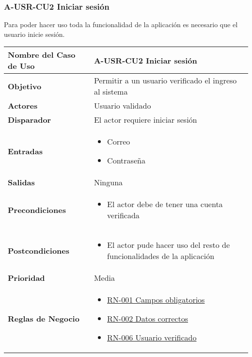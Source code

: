 \subsubsection{A-USR-CU2 Iniciar sesión}
Para poder hacer uso toda la funcionalidad de la aplicación es necesario que el usuario inicie sesión.
\begin{longtable}{|J{5cm}|J{10.3cm}|}
	\hline
	\textbf{Nombre del Caso de Uso} &
		A-USR-CU2 Iniciar sesión \\ \hline
	\textbf{Objetivo} &
		Permitir a un usuario verificado el ingreso al sistema \\ \hline
	\textbf{Actores} &
		Usuario validado \\ \hline 
	\textbf{Disparador} & 
		El actor requiere iniciar sesión \\ \hline 
	\textbf{Entradas} & 
		\begin{itemize}
				\item Correo
				\item Contraseña
		\end{itemize}\\ \hline 
	\textbf{Salidas} & 
		Ninguna \\ \hline
	\textbf{Precondiciones} &
		\begin{itemize}
				\item El actor debe de tener una cuenta verificada
		\end{itemize} \\ \hline
	\textbf{Postcondiciones} &
		\begin{itemize}
			\item El actor pude hacer uso del resto de funcionalidades de la aplicación
		\end{itemize}\\ \hline
	\textbf{Prioridad} & 
		Media \\ \hline
	\textbf{Reglas de Negocio} & 
		\begin{itemize}
			\item \hyperref[RN001]{RN-001 Campos obligatorios}
			\item \hyperref[RN002]{RN-002 Datos correctos}
			\item \hyperref[RN006]{RN-006 Usuario verificado}
		\end{itemize} \\ \hline

\end{longtable}
